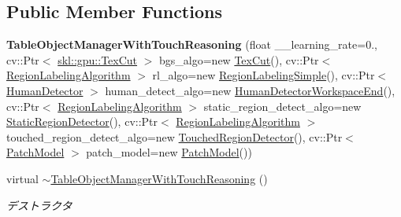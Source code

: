 \subsection*{Public Member Functions}
\begin{DoxyCompactItemize}
\item 
\hypertarget{classskl_1_1gpu_1_1_table_object_manager_with_touch_reasoning_a8d5dc605bb1cf199c16f77dbbd2a84fa}{}\label{classskl_1_1gpu_1_1_table_object_manager_with_touch_reasoning_a8d5dc605bb1cf199c16f77dbbd2a84fa} 
{\bfseries Table\+Object\+Manager\+With\+Touch\+Reasoning} (float \+\_\+\+\_\+learning\+\_\+rate=0., cv\+::\+Ptr$<$ \hyperlink{classskl_1_1gpu_1_1_tex_cut}{skl\+::gpu\+::\+Tex\+Cut} $>$ bgs\+\_\+algo=new \hyperlink{classskl_1_1gpu_1_1_tex_cut}{Tex\+Cut}(), cv\+::\+Ptr$<$ \hyperlink{classskl_1_1_filter_mat2_mat}{Region\+Labeling\+Algorithm} $>$ rl\+\_\+algo=new \hyperlink{classskl_1_1_region_labeling_simple}{Region\+Labeling\+Simple}(), cv\+::\+Ptr$<$ \hyperlink{classskl_1_1_filter_mat2_mat}{Human\+Detector} $>$ human\+\_\+detect\+\_\+algo=new \hyperlink{classskl_1_1_human_detector_workspace_end}{Human\+Detector\+Workspace\+End}(), cv\+::\+Ptr$<$ \hyperlink{classskl_1_1_filter_mat2_mat}{Region\+Labeling\+Algorithm} $>$ static\+\_\+region\+\_\+detect\+\_\+algo=new \hyperlink{classskl_1_1_static_region_detector}{Static\+Region\+Detector}(), cv\+::\+Ptr$<$ \hyperlink{classskl_1_1_filter_mat2_mat}{Region\+Labeling\+Algorithm} $>$ touched\+\_\+region\+\_\+detect\+\_\+algo=new \hyperlink{classskl_1_1_touched_region_detector}{Touched\+Region\+Detector}(), cv\+::\+Ptr$<$ \hyperlink{classskl_1_1_patch_model}{Patch\+Model} $>$ patch\+\_\+model=new \hyperlink{classskl_1_1_patch_model}{Patch\+Model}())
\item 
\hypertarget{classskl_1_1gpu_1_1_table_object_manager_with_touch_reasoning_a4d38c192d84e9184d11f2bbe55733e4f}{}\label{classskl_1_1gpu_1_1_table_object_manager_with_touch_reasoning_a4d38c192d84e9184d11f2bbe55733e4f} 
virtual \hyperlink{classskl_1_1gpu_1_1_table_object_manager_with_touch_reasoning_a4d38c192d84e9184d11f2bbe55733e4f}{$\sim$\+Table\+Object\+Manager\+With\+Touch\+Reasoning} ()
\begin{DoxyCompactList}\small\item\em デストラクタ \end{DoxyCompactList}\item 
\hypertarget{classskl_1_1gpu_1_1_table_object_manager_with_touch_reasoning_a7a82b7839390fe4d51cb5b572b4253c6}{}\label{classskl_1_1gpu_1_1_table_object_manager_with_touch_reasoning_a7a82b7839390fe4d51cb5b572b4253c6} 

\end{DoxyCompactItemize}
